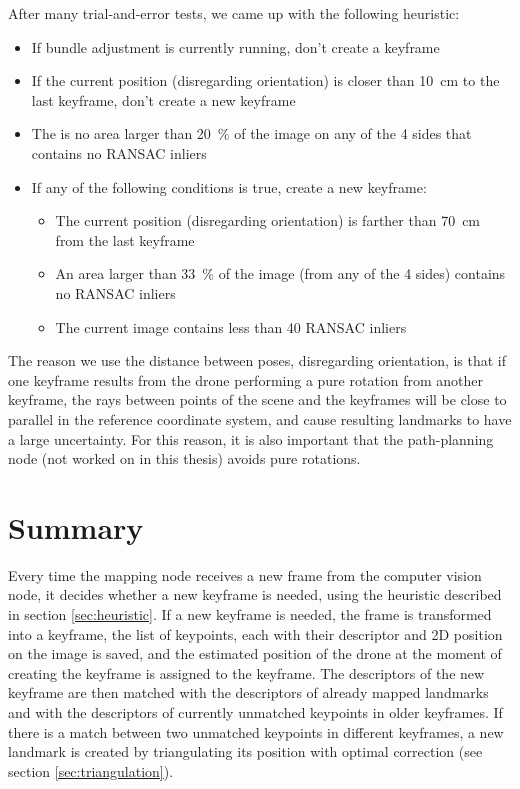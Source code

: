 After many trial-and-error tests, we came up with the following heuristic:

\begin{itemize}
\item{If bundle adjustment is currently running, don't create a keyframe}
\item{If the current position (disregarding orientation) is closer than \SI{10}{\centi\meter} to the last keyframe, don't create a new keyframe}
\item{The is no area larger than \SI{20}{\percent} of the image on any of the 4 sides that contains no RANSAC inliers}
\item{If any of the following conditions is true, create a new keyframe:}
\begin{itemize}
	\item{The current position (disregarding orientation) is farther than \SI{70}{\centi\meter} from the last keyframe}
	\item{An area larger than \SI{33}{\percent} of the image (from any of the 4 sides) contains no RANSAC inliers}
	\item{The current image contains less than 40 RANSAC inliers}
\end{itemize}
\end{itemize}

The reason we use the distance between poses, disregarding orientation, is that if one keyframe results from the drone performing a pure rotation from another keyframe, the rays between points of the scene and the keyframes will be close to parallel in the reference coordinate system, and cause resulting landmarks to have a large uncertainty. For this reason, it is also important that the path-planning node (not worked on in this thesis) avoids pure rotations.

\section{Summary}
Every time the mapping node receives a new frame from the computer vision node, it decides whether a new keyframe is needed, using the heuristic described in section \ref{sec:heuristic}. If a new keyframe is needed, the frame is transformed into a keyframe, the list of keypoints, each with their descriptor and 2D position on the image is saved, and the estimated position of the drone at the moment of creating the keyframe is assigned to the keyframe. The descriptors of the new keyframe are then matched with the descriptors of already mapped landmarks and with the descriptors of currently unmatched keypoints in older keyframes. If there is a match between two unmatched keypoints in different keyframes, a new landmark is created by triangulating its position with optimal correction (see section \ref{sec:triangulation}).\\

